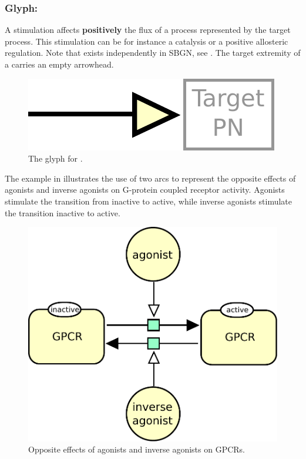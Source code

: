 
\subsubsection{Glyph: }\label{sec:stimulation}

A stimulation affects \textbf{positively} the flux of a process represented by the target process. This stimulation can be for instance a catalysis or a positive allosteric regulation. Note that  exists independently in SBGN, see . The target extremity of a  carries an empty arrowhead.

\begin{figure}[htb]
  \centering
  \includegraphics[scale = 0.5]{le_images/stimulation}
  \caption{The \PD glyph for .}
  \label{fig:stimulation}
\end{figure}

The example in  illustrates the use of two  arcs to represent the opposite effects of agonists and inverse agonists on G-protein coupled receptor activity. Agonists stimulate the transition from inactive to active, while inverse agonists stimulate the transition inactive to active.

\begin{figure}[htb]
  \centering
  \includegraphics[scale = 0.5]{le_images/stimulation-reversible}
  \caption{Opposite effects of agonists and inverse agonists on GPCRs.}
  \label{fig:stimulation-reversible}
\end{figure}

